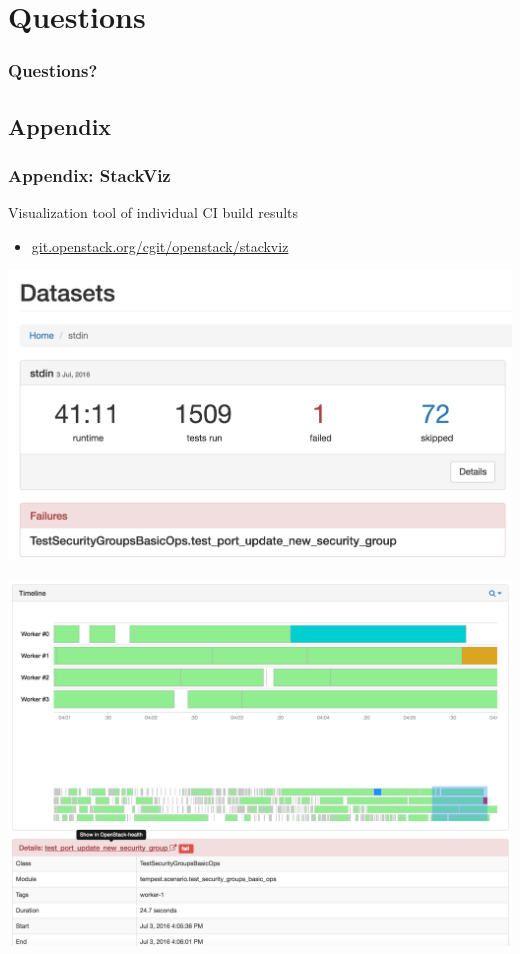 \documentclass[aspectratio=43,11pt,hyperref={colorlinks=true}]{beamer}
\begin{document}
\section{Questions}
\begin{frame}
\frametitle{Questions?}
\end{frame}

\subsection{Appendix}
\begin{frame}
  \frametitle{Appendix: StackViz}
  Visualization tool of individual CI build results
  \begin{itemize}
    \item \href{http://git.openstack.org/cgit/openstack/stackviz}{git.openstack.org/cgit/openstack/stackviz}
  \end{itemize}
  \begin{center}
    \includegraphics[width=1.0\textheight]{stackviz-sample-top.png}
  \end{center}
\end{frame}

\begin{frame}
  \begin{center}
    \includegraphics[width=1.0\textheight]{stackviz-sample-timeline.png}
  \end{center}
\end{frame}
\end{document}

